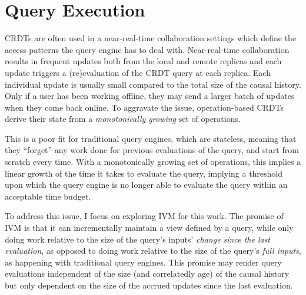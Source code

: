 \section{Query Execution}

\acp{CRDT} are often used in a near-real-time collaboration settings which
define the access patterns the query engine has to deal with.
Near-real-time collaboration results in frequent updates both from the local
and remote replicas and each update triggers a (re)evaluation of the
\ac{CRDT} query at each replica.
Each individual update is usually small compared to the total size of the
causal history.
Only if a user has been working offline, they may send a larger batch of
updates when they come back online.
To aggravate the issue, operation-based \acp{CRDT} derive their state from a
\emph{monotonically growing} set of operations.

This is a poor fit for traditional query engines, which are stateless,
meaning that they ``forget'' any work done for previous evaluations of the query,
and start from scratch every time.
With a monotonically growing set of operations, this implies a linear
growth of the time it takes to evaluate the query, implying a threshold
upon which the query engine is no longer able to evaluate the query within
an acceptable time budget.

To address this issue, I focus on exploring \ac{IVM} for this work.
The promise of \ac{IVM} is that it can incrementally maintain a view defined
by a query, while only doing work relative to the size of the query's
inputs' \emph{change since the last evaluation}, as opposed to doing work
relative to the size of the query's \emph{full inputs},
as happening with traditional query engines.
This promise may render query evaluations independent of the size
(and correlatedly age) of the causal history but only dependent on the
size of the accrued updates since the last evaluation.
